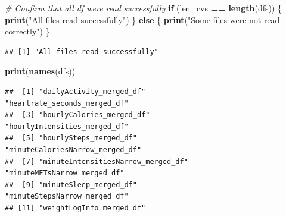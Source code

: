 \documentclass[
]{article}
\newenvironment{Shaded}{\begin{snugshade}}{\end{snugshade}}
\newcommand{\CommentTok}[1]{\textcolor[rgb]{0.56,0.35,0.01}{\textit{#1}}}
\newcommand{\ControlFlowTok}[1]{\textcolor[rgb]{0.13,0.29,0.53}{\textbf{#1}}}
\newcommand{\FunctionTok}[1]{\textcolor[rgb]{0.13,0.29,0.53}{\textbf{#1}}}
\newcommand{\NormalTok}[1]{#1}
\newcommand{\SpecialCharTok}[1]{\textcolor[rgb]{0.81,0.36,0.00}{\textbf{#1}}}
\newcommand{\StringTok}[1]{\textcolor[rgb]{0.31,0.60,0.02}{#1}}
\begin{document}
\begin{Shaded}
\begin{Highlighting}[]
\CommentTok{\# Confirm that all df were read successfully}
\ControlFlowTok{if}\NormalTok{ (len\_cvs }\SpecialCharTok{==} \FunctionTok{length}\NormalTok{(dfs)) \{}
  \FunctionTok{print}\NormalTok{(}\StringTok{"All files read successfully"}\NormalTok{)}
\NormalTok{\} }\ControlFlowTok{else}\NormalTok{ \{}
  \FunctionTok{print}\NormalTok{(}\StringTok{"Some files were not read correctly"}\NormalTok{)}
\NormalTok{\}}
\end{Highlighting}
\end{Shaded}

\begin{verbatim}
## [1] "All files read successfully"
\end{verbatim}

\begin{Shaded}
\begin{Highlighting}[]
\FunctionTok{print}\NormalTok{(}\FunctionTok{names}\NormalTok{(dfs))}
\end{Highlighting}
\end{Shaded}

\begin{verbatim}
##  [1] "dailyActivity_merged_df"           "heartrate_seconds_merged_df"      
##  [3] "hourlyCalories_merged_df"          "hourlyIntensities_merged_df"      
##  [5] "hourlySteps_merged_df"             "minuteCaloriesNarrow_merged_df"   
##  [7] "minuteIntensitiesNarrow_merged_df" "minuteMETsNarrow_merged_df"       
##  [9] "minuteSleep_merged_df"             "minuteStepsNarrow_merged_df"      
## [11] "weightLogInfo_merged_df"
\end{verbatim}
\end{document}
